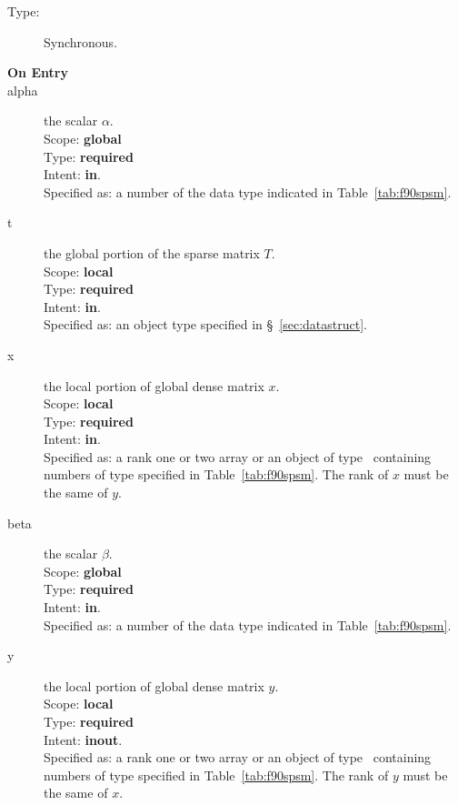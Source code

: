 \begin{description}
\item[Type:] Synchronous.
\item[\bf On Entry]
\item[alpha] the scalar $\alpha$.\\
Scope: {\bf global} \\
Type: {\bf required}\\
Intent: {\bf in}.\\
Specified as: a number of the data type indicated in
Table~\ref{tab:f90spsm}.
\item[t] the global portion of the sparse matrix
$T$.  \\
Scope: {\bf local} \\
Type: {\bf required}\\
Intent: {\bf in}.\\
Specified as: an object type specified in
\S~\ref{sec:datastruct}.
\item[x] the local portion of global dense matrix
$x$. %
\\
Scope: {\bf local} \\
Type: {\bf required} \\
Intent: {\bf in}.\\
Specified as:  a rank one or two array or an object of type \vdata\
containing numbers of type specified in
Table~\ref{tab:f90spsm}.  The rank of $x$ must be the same of $y$.
\item[beta] the scalar $\beta$.\\
Scope: {\bf global} \\
Type: {\bf required} \\
Intent: {\bf in}.\\
Specified as: a number of the data type indicated in Table~\ref{tab:f90spsm}.
\item[y] the local portion of global dense matrix
$y$. %
\\
Scope: {\bf local} \\
Type: {\bf required} \\
Intent: {\bf inout}.\\
Specified as:  a rank one or two array or an object of type \vdata\
containing numbers of type specified in
Table~\ref{tab:f90spsm}. The rank of $y$ must be the same of $x$.

\end{description}

